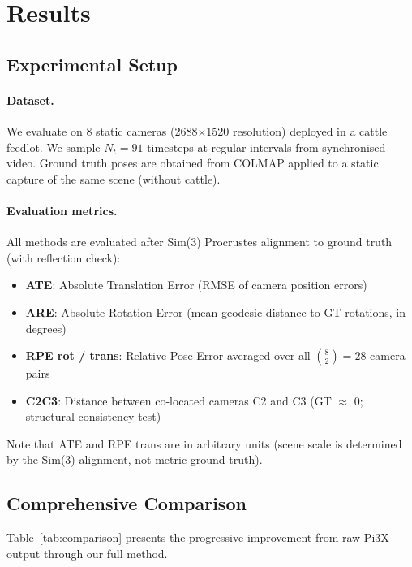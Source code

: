 \section{Results}
\label{sec:results}

\subsection{Experimental Setup}

\paragraph{Dataset.} We evaluate on 8 static cameras (2688$\times$1520 resolution) deployed in a cattle feedlot. We sample $N_t = 91$ timesteps at regular intervals from synchronised video. Ground truth poses are obtained from COLMAP applied to a static capture of the same scene (without cattle).

\paragraph{Evaluation metrics.} All methods are evaluated after Sim(3) Procrustes alignment to ground truth (with reflection check):
\begin{itemize}
    \item \textbf{ATE}: Absolute Translation Error (RMSE of camera position errors)
    \item \textbf{ARE}: Absolute Rotation Error (mean geodesic distance to GT rotations, in degrees)
    \item \textbf{RPE rot / trans}: Relative Pose Error averaged over all $\binom{8}{2} = 28$ camera pairs
    \item \textbf{C2C3}: Distance between co-located cameras C2 and C3 (GT $\approx$ 0; structural consistency test)
\end{itemize}

Note that ATE and RPE trans are in arbitrary units (scene scale is determined by the Sim(3) alignment, not metric ground truth).

\subsection{Comprehensive Comparison}

Table~\ref{tab:comparison} presents the progressive improvement from raw Pi3X output through our full method.


